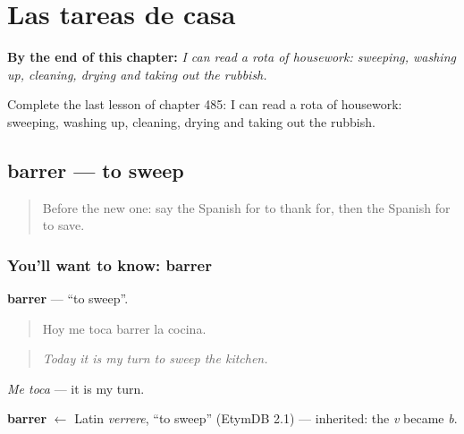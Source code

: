 
\chapter{Las tareas de casa}
\label{ch:es-las-tareas-de-casa}

\begin{chapteropening}
\textbf{By the end of this chapter:} \emph{I can read a rota of housework: sweeping, washing up, cleaning, drying and taking out the rubbish.}

Complete the last lesson of chapter 485: I can read a rota of housework: sweeping, washing up, cleaning, drying and taking out the rubbish.
\end{chapteropening}

\section[barrer]{barrer — to sweep}

\label{lesson:ES-C485-barrer}



\begin{quote}
Before the new one: say the Spanish for to thank for, then the Spanish for to save.
\end{quote}

\subsection*{You'll want to know: barrer}
\textbf{barrer} — \textquotedblleft{}to sweep\textquotedblright{}.

\begin{quote}
Hoy me toca barrer la cocina.
\end{quote}

\begin{quote}
\emph{Today it is my turn to sweep the kitchen.}
\end{quote}

\emph{Me toca} — it is my turn.

\begin{cousinweb}
\textbf{barrer} $\leftarrow$ Latin \emph{verrere}, \textquotedblleft{}to sweep\textquotedblright{} (EtymDB 2.1) — inherited: the \emph{v} became \emph{b}.
\end{cousinweb}

